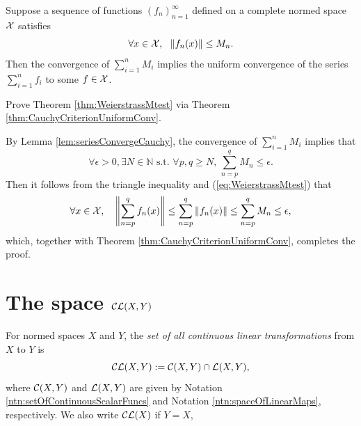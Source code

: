 \begin{thm}
  \label{thm:WeierstrassMtest}
  Suppose a sequence of functions $(f_n)_{n=1}^{\infty}$ 
  defined on a complete normed space ${\cal X}$ satisfies
  \begin{equation}
    \label{eq:WeierstrassMtest}
    \forall x\in{\cal X},\ \ \|f_n(x)\|\le M_n.
  \end{equation}
  Then the convergence of $\sum_{i=1}^n M_i$ 
  implies the uniform convergence of the series $\sum_{i=1}^n f_i$ 
  to some  $f\in{\cal X}$.
\end{thm}

\begin{exc}
  Prove Theorem \ref{thm:WeierstrassMtest}
  via Theorem \ref{thm:CauchyCriterionUniformConv}. 
\end{exc}
\begin{solution}
  By Lemma \ref{lem:seriesConvergeCauchy},
  the convergence of $\sum_{i=1}^nM_i$ implies that
  \begin{equation*}
    \forall \epsilon > 0,
    \exists N\in \mathbb{N}
    \text{ s.t. }
    \forall p, q \ge N, \,
    \sum_{n=p}^q M_n \le \epsilon.
  \end{equation*}
  Then it follows from the triangle inequality and (\ref{eq:WeierstrassMtest}) that
  \begin{equation*}
    \forall x\in {\cal X}, \quad
    \left\| \sum_{n=p}^q f_n(x) \right\| \le \sum_{n=p}^q \|f_n(x)\| \le
    \sum_{n=p}^q M_n \le \epsilon,
  \end{equation*}
  which, together with Theorem \ref{thm:CauchyCriterionUniformConv},
  completes the proof.
\end{solution}

\section{The space ${\cal CL}(X,Y)$}
\label{sec:space-CLXY}

\begin{ntn}
  For normed spaces $X$ and $Y$,
  the \emph{set of all continuous linear transformations}
  from $X$ to $Y$ is 
  \begin{equation}
    \label{eq:CL-XY}
    {\cal CL}(X,Y) := {\cal C}(X,Y) \cap {\cal L}(X,Y),
  \end{equation}
  where ${\cal C}(X,Y)$ and ${\cal L}(X,Y)$
  are given by 
  Notation \ref{ntn:setOfContinuousScalarFuncs}
  and Notation \ref{ntn:spaceOfLinearMaps}, respectively.
  We also write ${\cal CL}(X)$ if $Y=X$, 
\end{ntn}

